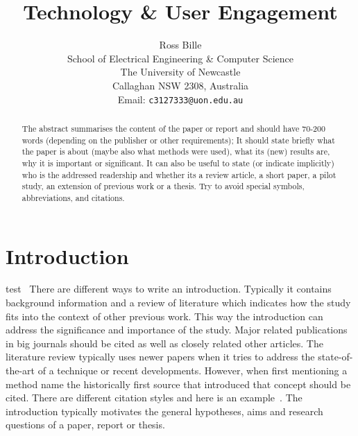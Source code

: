 \documentclass[a4,12pt]{article}
\begin{document}
%
\title{\bf Technology \& User Engagement}
%
\author{Ross Bille\\
School of Electrical Engineering \& Computer Science\\
The University of Newcastle\\ Callaghan NSW 2308, Australia\\
Email: \texttt{c3127333@uon.edu.au} } 
\maketitle


\newpage
\begin{abstract}%
\noindent The abstract summarises the content of the paper or report and should have 70-200 words (depending on the publisher or other requirements); It
should state briefly what the paper is about (maybe also what
methods were used), what its (new) results are, why it is
important or significant. It can also be useful to state (or
indicate implicitly) who is the addressed readership and whether
its a review article, a short paper, a pilot study, an
extension of previous work or a thesis. Try to avoid special symbols, abbreviations, and citations.
\end{abstract}

\pagebreak

\tableofcontents

\pagebreak

\section{Introduction}
test~\citep{test}
There are different ways to write an introduction. Typically it
contains background information and a review of literature which
indicates how the study fits into the context of other previous
work. This way the introduction can  address the significance and importance of the study. Major related publications in big journals should be cited
as well as closely related other articles. The literature review typically uses newer papers when it tries to address the state-of-the-art of a technique or recent developments. However, when first mentioning a method name the historically first source that introduced that concept should be cited. There are different citation styles and here is an example~\citep{QuinlanChalupMiddletonACRA2003}. The introduction
typically motivates the general hypotheses, aims and research questions
of a paper, report or thesis.  

\end{document}
